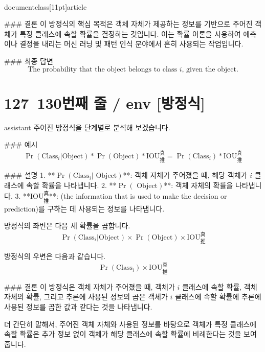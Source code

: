 \\documentclass[11pt]{article}
\begin{document}
### 결론
이 방정식의 핵심 목적은 객체 자체가 제공하는 정보를 기반으로 주어진 객체가 특정 클래스에 속할 확률을 결정하는 것입니다. 이는 확률 이론을 사용하여 예측이나 결정을 내리는 머신 러닝 및 패턴 인식 분야에서 흔히 사용되는 작업입니다.

### 최종 답변
\[
\boxed{\text{The probability that the object belongs to class } i \text{, given the object.}}
\]

\section*{127~130번째 줄 / env [방정식]}
assistant
주어진 방정식을 단계별로 분석해 보겠습니다.

### 예시
\[
\Pr(\textrm{Class}_i | \textrm{Object}) * \Pr(\textrm{Object}) * \textrm{IOU}_{\textrm{推}}^{\textrm{真}} = \Pr(\textrm{Class}_i) * \textrm{IOU}_{\textrm{推}}^{\textrm{真}}
\]

### 설명
1. **\(\Pr(\textrm{Class}_i | \textrm{ Object})\)**: 객체 자체가 주어졌을 때, 해당 객체가 \(i\) 클래스에 속할 확률을 나타냅니다.
2. **\(\Pr(\textrm{ Object})\)**: 객체 자체의 확률을 나타냅니다.
3. **\(\textrm{IOU}_{\textrm{推}}^{\textrm{真}}\)**: (the information that is used to make the decision or prediction)를 구하는 데 사용되는 정보를 나타냅니다.

방정식의 좌변은 다음 세 확률을 곱합니다.
\[
\Pr(\textrm{Class}_i | \textrm{Object}) \times \Pr(\textrm{Object}) \times \textrm{IOU}_{\textrm{推}}^{\textrm{真}}
\]

방정식의 우변은 다음과 같습니다.
\[
\Pr(\textrm{Class}_i) \times \textrm{IOU}_{\textrm{推}}^{\textrm{真}}
\]

### 결론
이 방정식은 객체 자체가 주어졌을 때, 객체가 \(i\) 클래스에 속할 확률, 객체 자체의 확률, 그리고 추론에 사용된 정보의 곱은 객체가 \(i\) 클래스에 속할 확률에 추론에 사용된 정보를 곱한 값과 같다는 것을 나타냅니다.

더 간단히 말해서, 주어진 객체 자체와 사용된 정보를 바탕으로 객체가 특정 클래스에 속할 확률은 추가 정보 없이 객체가 해당 클래스에 속할 확률에 비례한다는 것을 보여줍니다.
\end{document}
